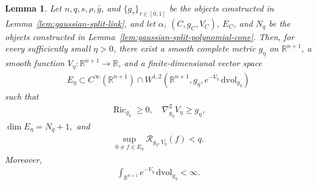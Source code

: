 \documentclass[11pt,reqno]{amsart}
\numberwithin{equation}{section}
\newtheorem{lem}[thm]{Lemma}
\theoremstyle{definition}
\theoremstyle{remark}
\def\cR {\mathcal{R}}
\newcommand{\ta}{\tau}
\newcommand{\0}{\emptyset}
\newcommand{\bbR}{\mathbb R}
\newcommand{\Ric}{\operatorname{Ric}}
\newcommand{\dvol}{\,\mathrm{dvol}}
\begin{document}
\begin{lem}\label{lem:gaussian-split-smoothing}
Let $n,q,s,\rho,\bar g$, and $\{g_\ta\}_{\ta\in[0,1]}$ be the objects
constructed in Lemma~\ref{lem:gaussian-split-link}, and let
$\alpha$, $(C,g_C,V_C)$, $E_C$, and $N_q$ be the objects constructed in
Lemma~\ref{lem:gaussian-split-polynomial-cone}. Then, for every sufficiently
small $\eta>0$, there exist a smooth complete metric $g_\eta$ on
$\bbR^{n+1}$, a smooth function $V_\eta:\bbR^{n+1}\to\bbR$, and a
finite-dimensional vector space
\begin{align}
        E_\eta
        \subset
        C^\infty(\bbR^{n+1})
        \cap
        W^{1,2}
        \left(
        \bbR^{n+1},g_\eta,e^{-V_\eta}\dvol_{g_\eta}
        \right)
\end{align}
such that
\begin{align}\label{eq:gaussian-split-smoothed-curvature}
        \Ric_{g_\eta}\geq0,
        \quad
        \nabla_{g_\eta}^2V_\eta\geq g_\eta,
\end{align}
$\dim E_\eta=N_q+1,$ and
\begin{align}\label{eq:gaussian-split-smoothed-Rayleigh}
        \sup_{0\neq f\in E_\eta}
        \cR_{g_\eta,V_\eta}(f)
        <
        q.
\end{align}
Moreover,
\begin{align}\label{eq:gaussian-split-smoothed-finite-mass}
        \int_{\bbR^{n+1}}e^{-V_\eta}\dvol_{g_\eta}<\infty.
\end{align}
\end{lem}
\end{document}
